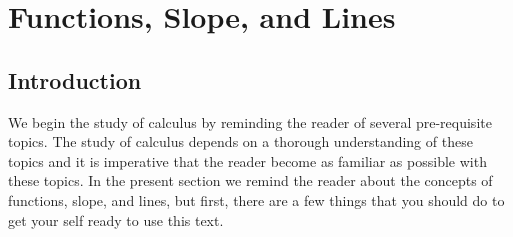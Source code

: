 \section{Functions, Slope, and Lines} \label{S:0.1.Functions}


\vspace*{-14 pt}


\nin \hrulefill



\subsection*{Introduction}
We begin the study of calculus by reminding the reader of several pre-requisite topics.
The study of calculus depends on a thorough understanding of these topics and it is
imperative that the reader become as familiar as possible with these topics.  In the
present section we remind the reader about the concepts of functions, slope, and lines,
but first, there are a few things that you should do to get your self ready to use this
text.



